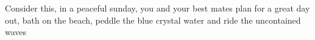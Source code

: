 Consider this, in a peaceful sunday, you and your best mates plan for a great day out, bath on the beach, peddle the blue crystal water and ride the uncontained waves 